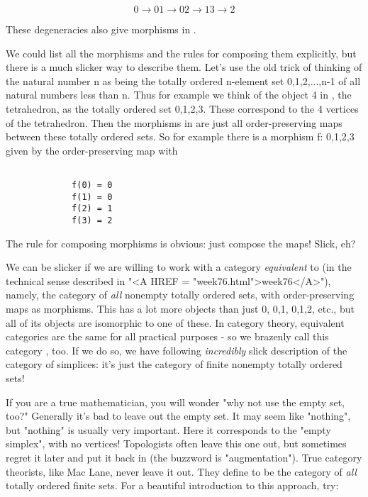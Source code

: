 $$

             0 \to  0
             1 \to  0
             2 \to  1
             3 \to  2

$$
    
These degeneracies also give morphisms in \Delta .  

We could list all the morphisms and the rules for composing them
explicitly, but there is a much slicker way to describe them.  Let's use
the old trick of thinking of the natural number n as being the totally
ordered n-element set {0,1,2,...,n-1} of all natural numbers less than
n.  Thus for example we think of the object 4 in \Delta , the tetrahedron,
as the totally ordered set {0,1,2,3}.  These correspond to the 4
vertices of the tetrahedron.  Then the morphisms in \Delta  are just all
order-preserving maps between these totally ordered sets.  So for
example there is a morphism f: {0,1,2,3}  given by the
order-preserving map with


\begin{verbatim}

             f(0) = 0
             f(1) = 0
             f(2) = 1
             f(3) = 2

\end{verbatim}
    
The rule for composing morphisms is obvious: just compose the maps!
Slick, eh?  

We can be slicker if we are willing to work with a category \emph{equivalent}
to \Delta  (in the technical sense described in "<A HREF = "week76.html">week76</A>"), namely, the
category of \emph{all} nonempty totally ordered sets, with order-preserving
maps as morphisms.  This has a lot more objects than just {0}, {0,1},
{0,1,2}, etc., but all of its objects are isomorphic to one of these.
In category theory, equivalent categories are the same for all practical
purposes - so we brazenly call this category \Delta , too.  If we do
so, we have following \emph{incredibly} slick description of the category
of simplices: it's just the category of finite nonempty totally ordered
sets!

If you are a true mathematician, you will wonder "why not use the empty
set, too?"  Generally it's bad to leave out the empty set.  It may seem
like "nothing", but "nothing" is usually very important.  Here it
corresponds to the "empty simplex", with no vertices!  Topologists often
leave this one out, but sometimes regret it later and put it back in
(the buzzword is "augmentation").  True category theorists, like Mac
Lane, never leave it out.  They define \Delta  to be the category of \emph{all}
totally ordered finite sets.  For a beautiful introduction to this
approach, try:

